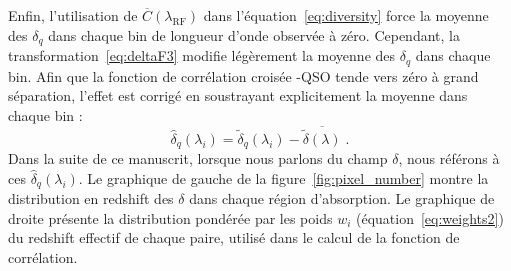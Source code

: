 Enfin, l'utilisation de $\overline C(\lambda_{\mathrm{RF}})$ dans l'équation~\ref{eq:diversity} force la moyenne des $\delta_q$ dans chaque bin de longueur d'onde observée à zéro. Cependant, la transformation~\ref{eq:deltaF3} modifie légèrement la moyenne des $\delta_q$  dans chaque bin. Afin que la fonction de corrélation croisée \lya{}-QSO tende vers zéro à grand séparation, l'effet est corrigé en soustrayant explicitement la moyenne dans chaque bin :
\begin{equation}
  \hat \delta_q(\lambda_i) = \tilde \delta_q(\lambda_i) - \overline{\tilde \delta(\lambda)} \; .
\end{equation}
Dans la suite de ce manuscrit, lorsque nous parlons du champ $\delta$, nous référons à ces $\hat \delta_q(\lambda_i)$. Le graphique de gauche de la figure~\ref{fig:pixel_number} montre la distribution en redshift des $\delta$ dans chaque région d'absorption. Le graphique de droite présente la distribution pondérée par les poids $w_i$ (équation~\ref{eq:weights2}) du redshift effectif de chaque paire, utilisé dans le calcul de la fonction de corrélation.



  
% 


% 
